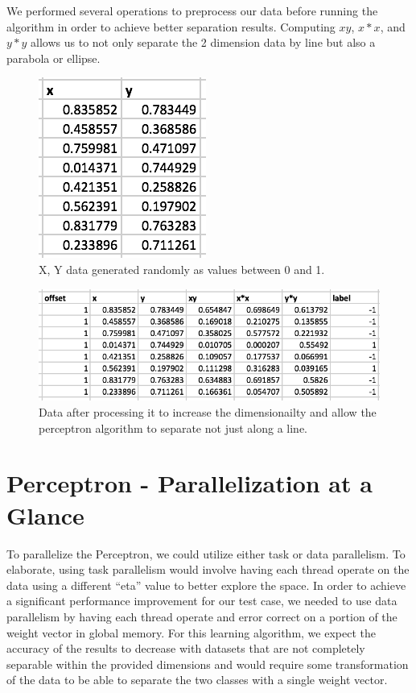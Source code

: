 \documentclass{article}
\begin{document}
We performed several operations to preprocess our data before running the algorithm in order to achieve better separation results. Computing $xy$, $x*x$, and $y*y$ allows us to not only separate the 2 dimension data by line but also a parabola or ellipse. 

\begin{figure}[!htbp]
\begin{center}
\includegraphics[width=.3\textwidth]{XY.png} %
\caption{X, Y data generated randomly as values between 0 and 1.}
\end{center}
\end{figure}

\begin{figure}[!htbp]
\begin{center}
\includegraphics[width=1.0\textwidth]{XYProcessed.png} %
\caption{Data after processing it to increase the dimensionailty and allow the perceptron algorithm to separate not just along a line.}
\end{center}
\end{figure}



\clearpage
\section{Perceptron - Parallelization at a Glance}
To parallelize the Perceptron, we could utilize either task or data parallelism. To elaborate, using task parallelism would involve having each thread operate on the data using a different ``eta'' value to better explore the space. In order to achieve a significant performance improvement for our test case, we needed to use data parallelism by having each thread operate and error correct on a portion of the weight vector in global memory. For this learning algorithm, we expect the accuracy of the results to decrease with datasets that are not completely separable within the provided dimensions and would require some transformation of the data to be able to separate the two classes with a single weight vector.
\end{document}
